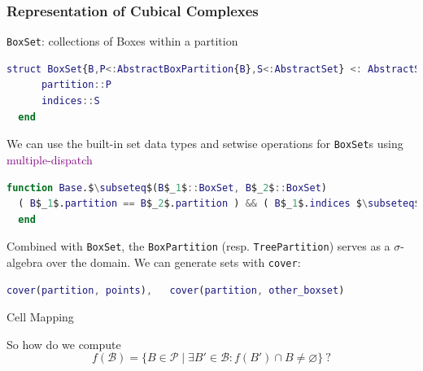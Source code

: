 \documentclass[
  english,            %
  aspectratio=169,    %
]{tumbeamer}
\newcommand{\cB}{\mathcal{B}}
\newcommand{\cP}{\mathcal{P}}
\renewcommand{\emph}[1]{\textcolor{purple}{#1}}
\begin{document}
\begin{frame}[fragile]
\frametitle{Representation of Cubical Complexes}

\texttt{BoxSet}: collections of Boxes within a partition

\begin{lstlisting}[language=Matlab,mathescape]
  struct BoxSet{B,P<:AbstractBoxPartition{B},S<:AbstractSet} <: AbstractSet{B}
      partition::P
      indices::S
  end
\end{lstlisting}

We can use the built-in set data types and setwise operations for \texttt{BoxSet}s using \emph{multiple-dispatch}

\begin{lstlisting}[language=Matlab,mathescape]
  function Base.$\subseteq$(B$_1$::BoxSet, B$_2$::BoxSet)
  ( B$_1$.partition == B$_2$.partition ) && ( B$_1$.indices $\subseteq$ B$_2$.indices )
  end
\end{lstlisting}

Combined with \texttt{BoxSet}, the \texttt{BoxPartition} (resp. \texttt{TreePartition}) serves as a $\sigma$-algebra over the domain. We can generate sets with \texttt{cover}:

\begin{lstlisting}[language=Matlab,mathescape]
  cover(partition, points),   cover(partition, other_boxset)
\end{lstlisting}

\end{frame}

\begin{frame}{Cell Mapping}

So how do we compute 
\[
  f(\cB) = \{ B\in\cP \mid \exists B'\in\cB: f(B')\cap B \neq \varnothing\}\ ?
\]

\begin{figure}
  \label{fig:boximage}
\end{figure}

\end{frame}
\end{document}
